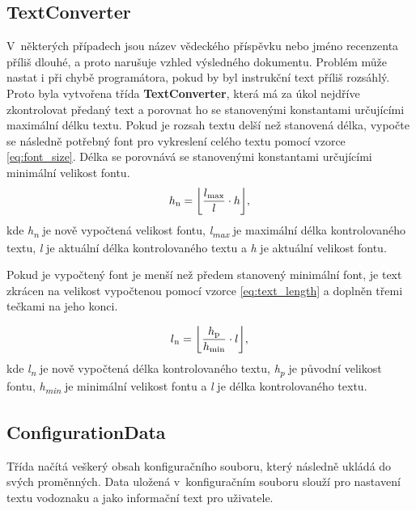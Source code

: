 \subsection{TextConverter}
V~některých případech jsou název vědeckého příspěvku nebo jméno recenzenta příliš dlouhé, a proto narušuje vzhled výsledného dokumentu. Problém může nastat i při chybě programátora, pokud by byl instrukční text příliš rozsáhlý. Proto byla vytvořena třída \textbf{TextConverter}, která má za úkol nejdříve zkontrolovat předaný text a porovnat ho se stanovenými konstantami určujícími maximální délku textu. Pokud je rozsah textu delší než stanovená délka, vypočte se následně potřebný font pro vykreslení celého textu pomocí vzorce \eqref{eq:font_size}. Délka se porovnává se stanovenými konstantami určujícími minimální velikost fontu. 
\begin{equation}
h\textsubscript{n} = \floor*{\frac{l\textsubscript{max}}{l} \cdot h}, \\
\label{eq:font_size} 
\end{equation}
kde \textit{h\textsubscript{n}} je nově vypočtená velikost fontu, \textit{l\textsubscript{max}} je maximální délka kontrolovaného textu, \textit{l} je aktuální délka kontrolovaného textu a \textit{h} je aktuální velikost fontu.

Pokud je vypočtený font je menší než předem stanovený minimální font, je text zkrácen na velikost vypočtenou pomocí vzorce  \eqref{eq:text_length} a doplněn třemi tečkami na jeho konci. 

\begin{equation}
l\textsubscript{n} = \floor*{\frac{h\textsubscript{p}}{h\textsubscript{min}} \cdot l}, \\
\label{eq:text_length}
\end{equation}
kde \textit{l\textsubscript{n}} je nově vypočtená délka kontrolovaného textu, \textit{h\textsubscript{p}} je původní velikost fontu, \textit{h\textsubscript{min}} je minimální velikost fontu a \textit{l} je délka kontrolovaného textu.
\subsection{ConfigurationData}
Třída načítá veškerý obsah konfiguračního souboru, který následně ukládá do svých proměnných. Data uložená v~konfiguračním souboru slouží pro nastavení textu vodoznaku a jako informační text pro uživatele.
